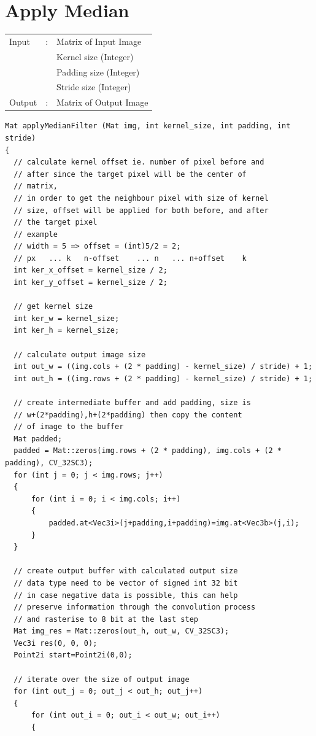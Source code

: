 \documentclass[12pt,a4paper]{report}
\begin{document}
\section{Apply Median}
\begin{tabular}{lll}
  Input  & : & Matrix of Input Image  \\
         &   & Kernel size (Integer)  \\
         &   & Padding size (Integer)  \\
         &   & Stride size (Integer)  \\
  Output & : & Matrix of Output Image \\
\end{tabular}
\begin{lstlisting}
Mat applyMedianFilter (Mat img, int kernel_size, int padding, int stride)
{
  // calculate kernel offset ie. number of pixel before and 
  // after since the target pixel will be the center of 
  // matrix,
  // in order to get the neighbour pixel with size of kernel
  // size, offset will be applied for both before, and after
  // the target pixel
  // example
  // width = 5 => offset = (int)5/2 = 2;
  // px   ... k   n-offset    ... n   ... n+offset    k
  int ker_x_offset = kernel_size / 2;
  int ker_y_offset = kernel_size / 2;

  // get kernel size
  int ker_w = kernel_size;
  int ker_h = kernel_size;

  // calculate output image size
  int out_w = ((img.cols + (2 * padding) - kernel_size) / stride) + 1;
  int out_h = ((img.rows + (2 * padding) - kernel_size) / stride) + 1;

  // create intermediate buffer and add padding, size is 
  // w+(2*padding),h+(2*padding) then copy the content 
  // of image to the buffer
  Mat padded;
  padded = Mat::zeros(img.rows + (2 * padding), img.cols + (2 * padding), CV_32SC3);
  for (int j = 0; j < img.rows; j++)
  {
      for (int i = 0; i < img.cols; i++)
      {
          padded.at<Vec3i>(j+padding,i+padding)=img.at<Vec3b>(j,i);
      }
  }
  
  // create output buffer with calculated output size
  // data type need to be vector of signed int 32 bit
  // in case negative data is possible, this can help
  // preserve information through the convolution process
  // and rasterise to 8 bit at the last step
  Mat img_res = Mat::zeros(out_h, out_w, CV_32SC3);
  Vec3i res(0, 0, 0);
  Point2i start=Point2i(0,0);

  // iterate over the size of output image
  for (int out_j = 0; out_j < out_h; out_j++)
  {
      for (int out_i = 0; out_i < out_w; out_i++)
      {


\end{lstlisting}
\end{document}
